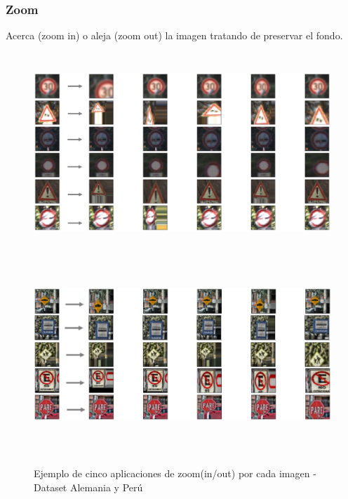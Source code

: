 		\newpage
	    \subsubsection{Zoom}
	    	Acerca (zoom in) o aleja (zoom out) la imagen  tratando de preservar el fondo.


			\begin{figure}[H]
				\begin{center}
				\includegraphics[width=1\textwidth,height=7.5cm]{images/desarrollo/Augment/zoom_inv}
				\includegraphics[width=1\textwidth,height=7.5cm]{images/desarrollo/Augment/zoom_inv2}
				\end{center}
				\begin{center}
				\vspace{0.5em}
				\caption{\small{Ejemplo de cinco aplicaciones de zoom(in/out) por cada imagen - Dataset Alemania y Perú}}
				{\small{\fontsize{10}{16.8}\selectfont {Fuente: Elaboración propia}}}
				\end{center}
				\vspace{-1.5em}
			\end{figure}

